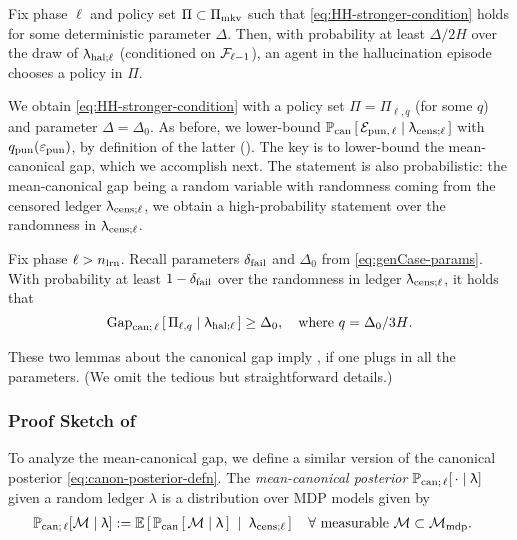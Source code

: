 \begin{lemma}\label{cor:mdp_hh}
Fix phase $\ell$ and policy set $\Pi \subset \Pi_{\mathrm{mkv}}$ such that \eqref{eq:HH-stronger-condition} holds for some deterministic parameter $\Delta$. Then, with probability at least $\Delta/2H$ over the draw of $\uplambda_{\mathrm{hal};\ell}$ (conditioned on $\mathcal{F}_{\ell-1}$), an agent in the hallucination episode chooses a policy in $\Pi$.
\end{lemma}


We obtain \eqref{eq:HH-stronger-condition} with a policy set $\Pi = \Pi_{\ell,q}$ (for some $q$) and parameter $\Delta = \Delta_0$. As before, we lower-bound
    $\operatorname{\mathbb{P}}_{\mathrm{can}}\left[\,\mathcal{E}_{\mathrm{pun},\,\ell} \mid \uplambda_{\mathrm{cens};\ell}\,\right]$
with  $q_{\mathrm{pun}}(\varepsilon_{\mathrm{pun}})$, by definition of the latter (). The key is to lower-bound the mean-canonical gap, which we accomplish next. The statement is also probabilistic: the mean-canonical gap being a random variable with randomness coming from the censored ledger $\uplambda_{\mathrm{cens};\ell}$, we obtain a high-probability statement over the randomness in $\uplambda_{\mathrm{cens};\ell}$.

\begin{lemma}\label{lemma:gap_bound_prob}
Fix phase $\ell > n_{\mathrm{lrn}}$. Recall parameters $\delta_{\mathrm{fail}}$ and $\Delta_0$ from \eqref{eq:genCase-params}. With probability at least $1 - \delta_{\mathrm{fail}}$ over the randomness in ledger $\uplambda_{\mathrm{cens};\ell}$, it holds that
\[ \mathrm{Gap}_{\mathrm{can};\,\ell}\left[\,\Pi_{\ell,q} \mid \uplambda_{\mathrm{hal};\ell}\,\right]
    \geq \Delta_0,
    \quad\text{where $q = \Delta_0/3H$}.\]
\end{lemma}

These two lemmas about the canonical gap imply , if one plugs in all the parameters. (We omit the tedious but straightforward details.)

\subsubsection*{Proof Sketch of }\label{ssec:sketch:lemma:gap_bound_prob}

To analyze the mean-canonical gap, we define a similar version of the canonical posterior \eqref{eq:canon-posterior-defn}. The \emph{mean-canonical posterior} $\operatorname{\mathbb{P}}_{\mathrm{can};\,\ell}[\,\cdot\mid\uplambda]$ given a random ledger $\lambda$ is a distribution over MDP models given by
\begin{align}\label{eq:hal-posterior-defn}
\operatorname{\mathbb{P}}_{\mathrm{can};\,\ell}[\mathcal{M} \mid\uplambda]
    &:= \mathbb{E}\left[\, \operatorname{\mathbb{P}}_{\mathrm{can}}\left[\, \mathcal{M} \mid \uplambda \,\right]
        \;\mid\; \uplambda_{\mathrm{cens};\ell} \,\right]
    \quad\forall \text{ measurable }\mathcal{M}\subset\mathcal{M}_{\mathrm{mdp}}.
\end{align}



